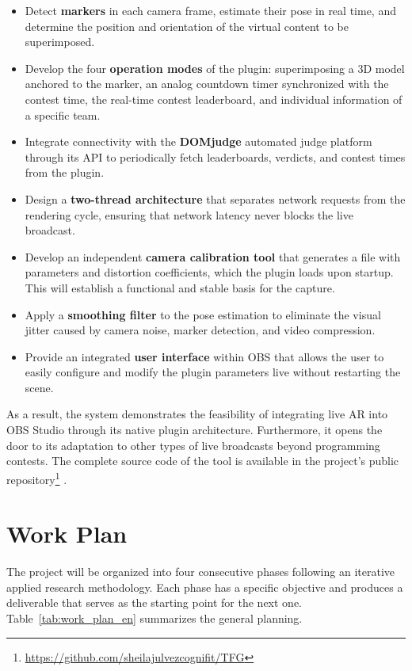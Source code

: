     \begin{itemize}
      \item Detect \textbf{markers} in each camera frame, estimate their pose in real time, and determine the position and orientation of the virtual content to be superimposed.
      \item Develop the four \textbf{operation modes} of the plugin: superimposing a 3D model anchored to the marker, an analog countdown timer synchronized with the contest time, the real-time contest leaderboard, and individual information of a specific team.
      \item Integrate connectivity with the \textbf{DOMjudge} automated judge platform through its API to periodically fetch leaderboards, verdicts, and contest times from the plugin.
      \item Design a \textbf{two-thread architecture} that separates network requests from the rendering cycle, ensuring that network latency never blocks the live broadcast.
      \item Develop an independent \textbf{camera calibration tool} that generates a file with parameters and distortion coefficients, which the plugin loads upon startup. This will establish a functional and stable basis for the capture.
      \item Apply a \textbf{smoothing filter} to the pose estimation to eliminate the visual jitter caused by camera noise, marker detection, and video compression.
      \item Provide an integrated \textbf{user interface} within OBS that allows the user to easily configure and modify the plugin parameters live without restarting the scene.
    \end{itemize}

As a result, the system demonstrates the feasibility of integrating live AR into OBS Studio through its native plugin architecture. Furthermore, it opens the door to its adaptation to other types of live broadcasts beyond programming contests. The complete source code of the tool is available in the project's public repository\footnote{\url{https://github.com/sheilajulvezcognifit/TFG}} \citep{PluginRepo}.

\section{Work Plan}

The project will be organized into four consecutive phases following an iterative applied research methodology. Each phase has a specific objective and produces a deliverable that serves as the starting point for the next one. Table~\ref{tab:work_plan_en} summarizes the general planning.


